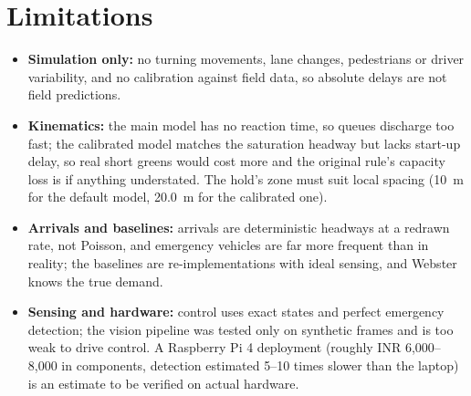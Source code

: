 \begin{table}[H]
\centering
\caption{Comparison with the strategies of existing work (re-implemented in the same simulator)}
\label{tab:comparison}
\small
{}
\par{}
\end{table}


\section{Limitations}
\begin{itemize}
  \item \textbf{Simulation only:} no turning movements, lane changes, pedestrians or driver variability, and no calibration against field data, so absolute delays are not field predictions.
  \item \textbf{Kinematics:} the main model has no reaction time, so queues discharge too fast; the calibrated model matches the saturation headway but lacks start-up delay, so real short greens would cost more and the original rule's capacity loss is if anything understated. The hold's zone must suit local spacing (10~m for the default model, 20.0~m for the calibrated one).
  \item \textbf{Arrivals and baselines:} arrivals are deterministic headways at a redrawn rate, not Poisson, and emergency vehicles are far more frequent than in reality; the baselines are re-implementations with ideal sensing, and Webster knows the true demand.
  \item \textbf{Sensing and hardware:} control uses exact states and perfect emergency detection; the vision pipeline was tested only on synthetic frames and is too weak to drive control. A Raspberry Pi 4 deployment (roughly INR 6,000--8,000 in components, detection estimated 5--10 times slower than the laptop) is an estimate to be verified on actual hardware.
\end{itemize}
